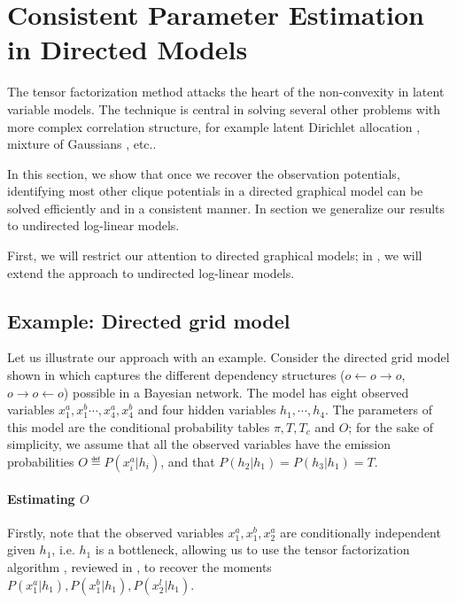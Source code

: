 \section{Consistent Parameter Estimation in Directed Models}
\label{sec:piecewise}

The tensor factorization method attacks the heart of the non-convexity
  in latent variable models.
The technique is central in solving several other problems with more
  complex correlation structure, for example latent Dirichlet allocation
  \citep{anandkumar12lda}, mixture of Gaussians \citep{hsu13spherical},
  etc..

In this section, we show that once we recover the observation
  potentials, identifying most other clique potentials in a directed graphical
  model can be solved efficiently and in a consistent manner.
In section  we generalize our results to undirected log-linear models.


First, we will restrict our attention to directed graphical models; in
, we will extend the approach to undirected
log-linear models.

\subsection{Example: Directed grid model}

Let us illustrate our approach with an example. 
Consider the directed grid model shown in  which
  captures the different dependency structures ($o \gets o \to o$, $o \to
  o \gets o$) possible in a Bayesian network.
The model has eight observed variables $x^a_1, x^b_1 \cdots, x^a_4, x^b_4$ and four
  hidden variables $h_1, \cdots, h_4$.
The parameters of this model are the conditional probability tables
  $\pi, T, T_c$ and $O$; for the sake of simplicity, we assume that all
  the observed variables have the emission probabilities $O \eqdef P(x^a_i
  | h_i)$, and that $P(h_2 | h_1) = P(h_3 | h_1) = T$.

\paragraph{Estimating $O$}

Firstly, note that the observed variables $x^a_1, x^b_1, x^a_2$ are
  conditionally independent given $h_1$, i.e. $h_1$ is a bottleneck,
  allowing us to use the tensor factorization algorithm
  \cite{anandkumar13tensor}, reviewed in , to
  recover the moments $P(x^a_1|h_1), P(x^b_1|h_1), P(x^l_2|h_1)$. 


